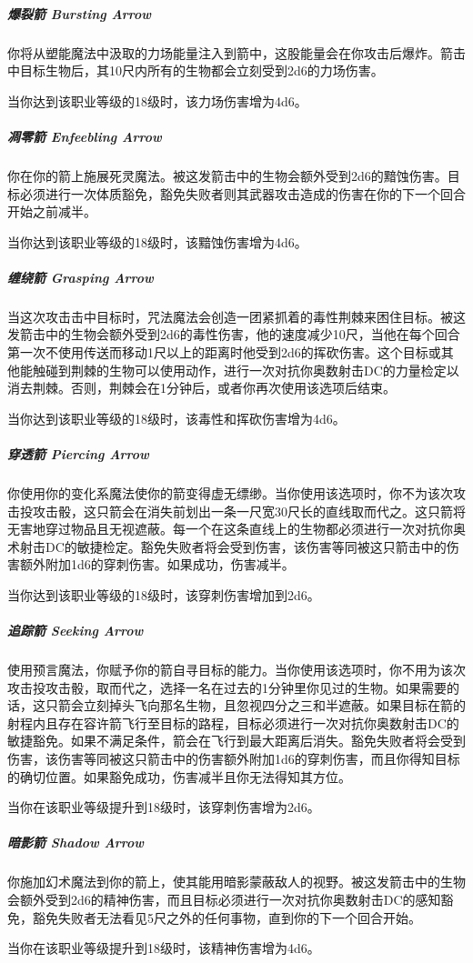 \subparagraph{爆裂箭 Bursting Arrow}你将从塑能魔法中汲取的力场能量注入到箭中，这股能量会在你攻击后爆炸。箭击中目标生物后，其10尺内所有的生物都会立刻受到2d6的力场伤害。

当你达到该职业等级的18级时，该力场伤害增为4d6。

\subparagraph{凋零箭 Enfeebling Arrow}你在你的箭上施展死灵魔法。被这发箭击中的生物会额外受到2d6的黯蚀伤害。目标必须进行一次体质豁免，豁免失败者则其武器攻击造成的伤害在你的下一个回合开始之前减半。

当你达到该职业等级的18级时，该黯蚀伤害增为4d6。

\subparagraph{缠绕箭 Grasping Arrow}当这次攻击击中目标时，咒法魔法会创造一团紧抓着的毒性荆棘来困住目标。被这发箭击中的生物会额外受到2d6的毒性伤害，他的速度减少10尺，当他在每个回合第一次不使用传送而移动1尺以上的距离时他受到2d6的挥砍伤害。这个目标或其他能触碰到荆棘的生物可以使用动作，进行一次对抗你奥数射击DC的力量检定以消去荆棘。否则，荆棘会在1分钟后，或者你再次使用该选项后结束。

当你达到该职业等级的18级时，该毒性和挥砍伤害增为4d6。

\subparagraph{穿透箭 Piercing Arrow}你使用你的变化系魔法使你的箭变得虚无缥缈。当你使用该选项时，你不为该次攻击投攻击骰，这只箭会在消失前划出一条一尺宽30尺长的直线取而代之。这只箭将无害地穿过物品且无视遮蔽。每一个在这条直线上的生物都必须进行一次对抗你奥术射击DC的敏捷检定。豁免失败者将会受到伤害，该伤害等同被这只箭击中的伤害额外附加1d6的穿刺伤害。如果成功，伤害减半。

当你达到该职业等级的18级时，该穿刺伤害增加到2d6。

\subparagraph{追踪箭 Seeking Arrow}使用预言魔法，你赋予你的箭自寻目标的能力。当你使用该选项时，你不用为该次攻击投攻击骰，取而代之，选择一名在过去的1分钟里你见过的生物。如果需要的话，这只箭会立刻掉头飞向那名生物，且忽视四分之三和半遮蔽。如果目标在箭的射程内且存在容许箭飞行至目标的路程，目标必须进行一次对抗你奥数射击DC的敏捷豁免。如果不满足条件，箭会在飞行到最大距离后消失。豁免失败者将会受到伤害，该伤害等同被这只箭击中的伤害额外附加1d6的穿刺伤害，而且你得知目标的确切位置。如果豁免成功，伤害减半且你无法得知其方位。

当你在该职业等级提升到18级时，该穿刺伤害增为2d6。

\subparagraph{暗影箭 Shadow Arrow}你施加幻术魔法到你的箭上，使其能用暗影蒙蔽敌人的视野。被这发箭击中的生物会额外受到2d6的精神伤害，而且目标必须进行一次对抗你奥数射击DC的感知豁免，豁免失败者无法看见5尺之外的任何事物，直到你的下一个回合开始。

当你在该职业等级提升到18级时，该精神伤害增为4d6。

